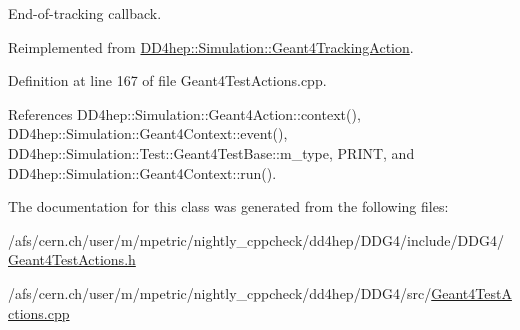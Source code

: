 End-\/of-\/tracking callback. 

Reimplemented from \hyperlink{class_d_d4hep_1_1_simulation_1_1_geant4_tracking_action_a29f980c180576781771ea325b4a73f14}{DD4hep::Simulation::Geant4TrackingAction}.

Definition at line 167 of file Geant4TestActions.cpp.

References DD4hep::Simulation::Geant4Action::context(), DD4hep::Simulation::Geant4Context::event(), DD4hep::Simulation::Test::Geant4TestBase::m\_\-type, PRINT, and DD4hep::Simulation::Geant4Context::run().

The documentation for this class was generated from the following files:\begin{DoxyCompactItemize}
\item 
/afs/cern.ch/user/m/mpetric/nightly\_\-cppcheck/dd4hep/DDG4/include/DDG4/\hyperlink{_geant4_test_actions_8h}{Geant4TestActions.h}\item 
/afs/cern.ch/user/m/mpetric/nightly\_\-cppcheck/dd4hep/DDG4/src/\hyperlink{_geant4_test_actions_8cpp}{Geant4TestActions.cpp}\end{DoxyCompactItemize}
